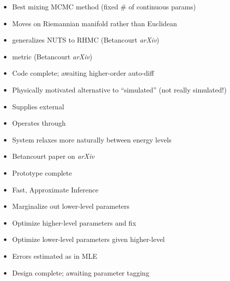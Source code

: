 \documentclass[10pt]{report}
\begin{document}
\begin{itemize}
\item Best mixing MCMC method (fixed \# of continuous params)
\item Moves on Riemannian manifold rather than Euclidean
\item {} generalizes NUTS to RHMC (Betancourt {\slshape arXiv})
\item {} metric (Betancourt {\slshape arXiv})
\vfill
\item Code complete; awaiting higher-order auto-diff
\end{itemize}

\begin{itemize}
\item Physically motivated alternative to ``simulated''
   (not really simulated!)
\item Supplies external 
\item Operates through 
\item System relaxes more naturally between energy levels
\item Betancourt paper on {\slshape arXiv}
  \vfill
\item Prototype complete
\end{itemize}

\begin{itemize}
\item Fast, Approximate Inference
\item Marginalize out lower-level parameters
\item Optimize higher-level parameters and fix
\item Optimize lower-level parameters given higher-level
\item Errors estimated as in MLE
  \vfill
\item Design complete; awaiting parameter tagging
\end{itemize}
\end{document}
